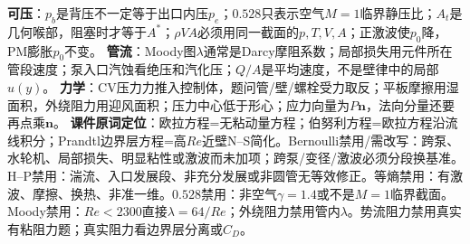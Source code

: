 {\fontsize{4.43}{4.53}\selectfont
\textbf{可压}：$p_b$是背压不一定等于出口内压$p_e$；$0.528$只表示空气$M=1$临界静压比；$A_t$是几何喉部，阻塞时才等于$A^*$；$\rho VA$必须用同一截面的$p,T,V,A$；正激波使$p_0$降，PM膨胀$p_0$不变。 
\textbf{管流}：Moody图$\lambda$通常是Darcy摩阻系数；局部损失用元件所在管段速度；泵入口汽蚀看绝压和汽化压；$Q/A$是平均速度，不是壁律中的局部$u(y)$。 
\textbf{力学}：CV压力力推入控制体，题问管/壁/螺栓受力取反；平板摩擦用湿面积，外绕阻力用迎风面积；压力中心低于形心；应力向量为$P\bm n$，法向分量还要再点乘$\bm n$。}
{\fontsize{4.43}{4.53}\selectfont
\textbf{课件原词定位}：欧拉方程=无粘动量方程；伯努利方程=欧拉方程沿流线积分；Prandtl边界层方程=高$Re$近壁N--S简化。Bernoulli禁用/需改写：跨泵、水轮机、局部损失、明显粘性或激波而未加项；跨泵/变径/激波必须分段换基准。H--P禁用：湍流、入口发展段、非充分发展或非圆管无等效修正。等熵禁用：有激波、摩擦、换热、非准一维。$0.528$禁用：非空气$\gamma=1.4$或不是$M=1$临界截面。Moody禁用：$Re<2300$直接$\lambda=64/Re$；外绕阻力禁用管内$\lambda$。势流阻力禁用真实有粘阻力题；真实阻力看边界层分离或$C_D$。}
